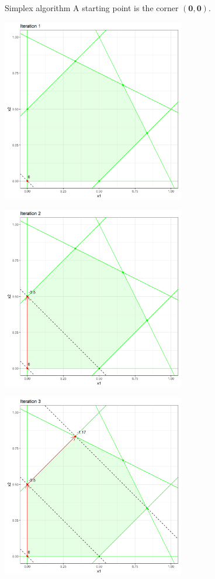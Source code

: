 \documentclass[11pt,compress,t,notes=noshow, xcolor=table]{beamer}
\begin{document}
\begin{vbframe}{Simplex algorithm}
A starting point is the corner $\bm{(0, 0)}$.

\framebreak

\begin{center}
\includegraphics[width = 0.6\textwidth]{figure_man/simplex_implementation/iter1.png}
\end{center}

\framebreak

\begin{center}
\includegraphics[width = 0.6\textwidth]{figure_man/simplex_implementation/iter2.png}
\end{center}

\framebreak

\begin{center}
\includegraphics[width = 0.6\textwidth]{figure_man/simplex_implementation/iter3.png}
\end{center}


\end{vbframe}
\end{document}
